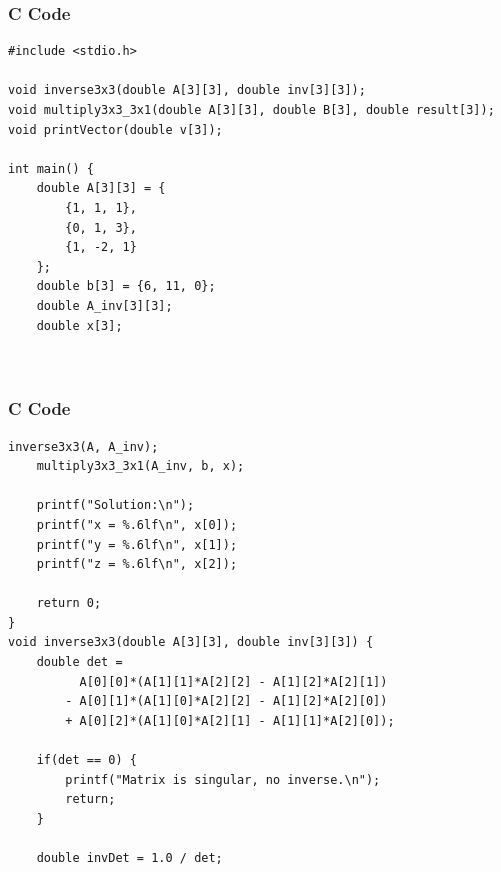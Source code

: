 \documentclass{beamer}
\begin{document}
\begin{frame}[fragile]
    \frametitle{C Code}

    \begin{lstlisting}
#include <stdio.h>

void inverse3x3(double A[3][3], double inv[3][3]);
void multiply3x3_3x1(double A[3][3], double B[3], double result[3]);
void printVector(double v[3]);

int main() {
    double A[3][3] = {
        {1, 1, 1},
        {0, 1, 3},
        {1, -2, 1}
    };
    double b[3] = {6, 11, 0};
    double A_inv[3][3];
    double x[3];

    
    \end{lstlisting}
\end{frame}

\begin{frame}[fragile]
    \frametitle{C Code}
    \begin{lstlisting}
inverse3x3(A, A_inv);
    multiply3x3_3x1(A_inv, b, x);

    printf("Solution:\n");
    printf("x = %.6lf\n", x[0]);
    printf("y = %.6lf\n", x[1]);
    printf("z = %.6lf\n", x[2]);

    return 0;
}
void inverse3x3(double A[3][3], double inv[3][3]) {
    double det =
          A[0][0]*(A[1][1]*A[2][2] - A[1][2]*A[2][1])
        - A[0][1]*(A[1][0]*A[2][2] - A[1][2]*A[2][0])
        + A[0][2]*(A[1][0]*A[2][1] - A[1][1]*A[2][0]);

    if(det == 0) {
        printf("Matrix is singular, no inverse.\n");
        return;
    }

    double invDet = 1.0 / det;
    \end{lstlisting}
\end{frame}
\end{document}
